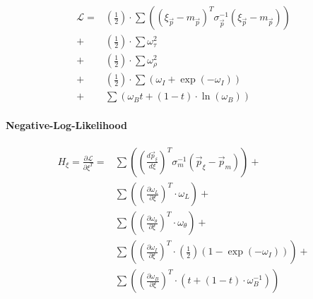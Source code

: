 \documentclass[review]{elsarticle}
\begin{document}
\begin{equation} \begin{alignedat}{-1}
    \mathcal{L}=&\left(\frac{1}{2}\right)\cdot\sum\left(\left(\xi_{\vec{p}}-m_{\vec{p}}\right)^{T}\sigma_{\vec{p}}^{-1}\left(\xi_{\vec{p}}-m_{\vec{p}}\right)\right)\\
               +&\left(\frac{1}{2}\right)\cdot\sum\omega_{\tau}^{2}\\
               +&\left(\frac{1}{2}\right)\cdot\sum\omega_{\rho}^{2}\\
               +&\left(\frac{1}{2}\right)\cdot\sum\left(\omega_{I}+\exp(-\omega_{I})\right)\\
               +&\sum\left(\omega_{B}t+\left(1-t\right)\cdot\ln\left(\omega_{B}\right)\right)
\end{alignedat} \end{equation} 

\paragraph{Negative-Log-Likelihood}
\begin{equation} \begin{alignedat}{-1}
        H_{\xi}=\frac{\partial\mathcal{L}}{\partial\xi^{T}}=
        &\sum\left(\left(\frac{d\vec{p}_{\xi}}{d\xi}\right)^{T}\sigma_{m}^{-1}\left(\vec{p}_{\xi}-\vec{p}_{m}\right)\right)+\\
        &\sum\left(\left(\frac{\partial\omega_{L}}{\partial\xi}\right)^{T}\cdot\omega_{L}\right)+\\
        &\sum\left(\left(\frac{\partial\omega_{\theta}}{\partial\xi}\right)^{T}\cdot\omega_{\theta}\right)+\\
        &\sum\left(\left(\frac{\partial\omega_{I}}{\partial\xi}\right)^{T}\cdot\left(\frac{1}{2}\right)\left(1-\exp(-\omega_{I})\right)\right)+\\
        &\sum\left(\left(\frac{\partial\omega_{B}}{\partial\xi}\right)^{T}\cdot\left(t+\left(1-t\right)\cdot\omega_{B}^{-1}\right)\right)
\end{alignedat} \end{equation} 
\end{document}
